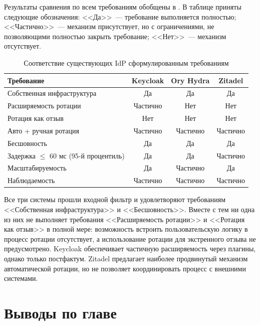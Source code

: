 Результаты сравнения по всем требованиям обобщены в .
В таблице приняты следующие обозначения:
<<Да>>~--- требование выполняется полностью;
<<Частично>>~--- механизм присутствует, но с ограничениями, не позволяющими
полностью закрыть требование;
<<Нет>>~--- механизм отсутствует.

\begin{table}[h]
  \centering
  \caption{Соответствие существующих IdP сформулированным требованиям}
  \label{tab:idp-comparison}
  \begin{tabularx}{\textwidth}{X c c c}
    \hline
    \textbf{Требование} & \textbf{Keycloak} & \textbf{Ory Hydra} & \textbf{Zitadel} \\
    \hline
    Собственная инфраструктура    & Да        & Да        & Да \\
    Расширяемость ротации        & Частично  & Нет       & Нет \\
    Ротация как отзыв            & Нет       & Нет       & Нет \\
    Авто + ручная ротация        & Частично  & Частично  & Частично \\
    Бесшовность                  & Да        & Да        & Да \\
    Задержка $\leq$ 60 мс (95-й процентиль)  & Да        & Да        & Частично \\
    Масштабируемость             & Да        & Частично  & Да \\
    Наблюдаемость                & Частично  & Частично  & Частично \\
    \hline
  \end{tabularx}
\end{table}

Все три системы прошли входной фильтр
и удовлетворяют требованиям <<Собственная инфраструктура>> и <<Бесшовность>>.
Вместе с тем ни одна из них не выполняет требования
<<Расширяемость ротации>> и <<Ротация как отзыв>> в полной мере:
возможность встроить пользовательскую логику в процесс ротации отсутствует,
а использование ротации для экстренного отзыва не предусмотрено.
Keycloak обеспечивает частичную расширяемость через плагины,
однако только постфактум.
Zitadel предлагает наиболее продвинутый механизм автоматической ротации,
но не позволяет координировать процесс с внешними системами.

\section{Выводы по главе}\label{sec:ch1-conclusion}


